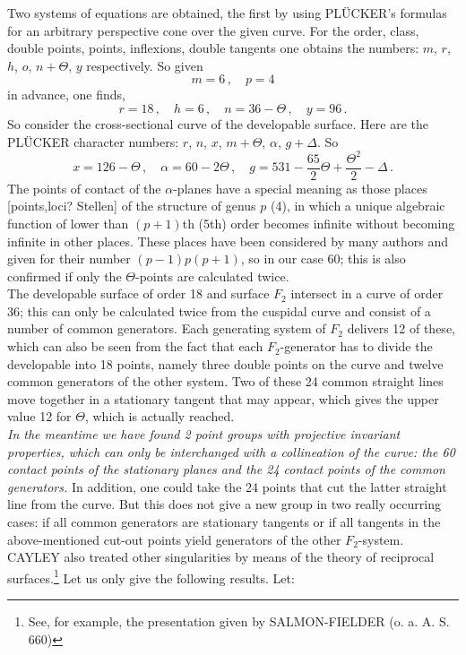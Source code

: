 \documentclass[leqno]{article}
\begin{document}
Two systems of equations are obtained, the first by using PL\"UCKER's formulas for an arbitrary perspective cone over the given curve. For the order, class, double points, points, inflexions, double tangents one obtains the numbers: $ m $, $ r $, $ h $, $ o $, $ n + \Theta $, $ y $ respectively. So given
\[
m=6 \, , \quad p=4
\]
in advance, one finds,
\[
r = 18 \, , \quad h = 6 \, , \quad n = 36-\Theta \, , \quad y = 96 \, .
\]
So consider the cross-sectional curve of the developable surface. Here are the PL\"UCKER character numbers: $r$, $n$, $x$, $m+\Theta$, $\alpha$, $g+\Delta$. So 
\[
x = 126-\Theta \, , \quad \alpha=60-2\Theta \, , \quad g = 531-\frac{65}{2}\Theta + \frac{\Theta^2}{2} - \Delta \, . 
\]
The points of contact of the $ \alpha$-planes have a special meaning as those places [points,loci? Stellen] of the structure of genus $p$ (4), in which a unique algebraic function of lower than $(p + 1)$th (5th) order becomes infinite without becoming infinite in other places. These places have been considered by many authors and given for their number $ (p-1) p (p + 1) $, so in our case 60; this is also confirmed if only the $ \Theta$-points are calculated twice. \\
The developable surface of order 18 and surface $ F_2 $ intersect in a curve of order 36; this can only be calculated twice from the cuspidal curve and consist of a number of common generators. Each generating system of $ F_2 $ delivers 12 of these, which can also be seen from the fact that each $ F_2$-generator has to divide the developable into 18 points, namely three double points on the curve and twelve common generators of the other system. Two of these 24 common straight lines move together in a stationary tangent that may appear, which gives the upper value 12 for $ \Theta $, which is actually reached. \\
\textit{In the meantime we have found 2 point groups with projective invariant properties, which can only be interchanged with a collineation of the curve: the 60 contact points of the stationary planes and the 24 contact points of the common generators.} In addition, one could take the 24 points that cut the latter straight line from the curve. But this does not give a new group in two really occurring cases: if all common generators are stationary tangents or if all tangents in the above-mentioned cut-out points yield generators of the other $ F_2 $-system. \\
CAYLEY also treated other singularities by means of the theory of reciprocal surfaces.\footnote{See, for example, the presentation given by SALMON-FIELDER (o. a. A. S. 660)} Let us only give the following results. Let:
\end{document}
